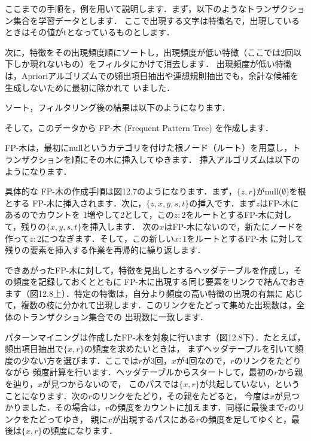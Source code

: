 ここまでの手順を，例を用いて説明します．まず，以下のようなトランザクション集合を学習データとします．
ここで出現する文字は特徴名で，出現しているときはその値がtとなっているものとします．


次に，特徴をその出現頻度順にソートし，出現頻度が低い特徴（ここでは2回以下しか現れないもの）をフィルタにかけて消去します．
出現頻度が低い特徴は，Aprioriアルゴリズムでの頻出項目抽出や連想規則抽出でも，余計な候補を生成しないために最初に除かれて
いました．

ソート，フィルタリング後の結果は以下のようになります．



そして，このデータから
FP-木 (Frequent Pattern Tree) 
を作成します．

FP-木は，最初にnullというカテゴリを付けた根ノード（ルート）を用意し，トランザクションを順にその木に挿入してゆきます．
挿入アルゴリズムは以下のようになります．


具体的な FP-木の作成手順は図12.7のようになります．まず，$\{z,r\}$がnull($\emptyset$)を根とする
FP-木に挿入されます．次に，$\{z,x,y,s,t\}$の挿入です．まず$z$はFP-木にあるのでカウントを
1増やして2として，この$z:2$をルートとするFP-木に対して，残りの$\{x,y,s,t\}$を挿入します．
次の$x$はFP-木にないので，新たにノードを作って$z:2$につなぎます．そして，この新しい$x:1$をルートとするFP-木
に対して残りの要素を挿入する作業を再帰的に繰り返します．


できあがったFP-木に対して，特徴を見出しとするヘッダテーブルを作成し，その頻度を記録しておくとともに
FP-木に出現する同じ要素をリンクで結んでおきます（図12.8上）．特定の特徴は，自分より頻度の高い特徴の出現の有無に
応じて，複数の枝に分かれて出現します．このリンクをたどって集めた出現数は，全体のトランザクション集合での
出現数に一致します．



パターンマイニングは作成したFP-木を対象に行います（図12.8下）．たとえば，頻出項目抽出で$\{x,r\}$の頻度を求めたいときは，
まずヘッダテーブルを引いて頻度の少ない方を選びます．ここでは$r$が3回，$x$が4回なので，$r$のリンクをたどりながら
頻度計算を行います．ヘッダテーブルからスタートして，最初の$r$から親を辿り，$x$が見つからないので，
このパスでは$\{x,r\}$が共起していない，ということになります．次の$r$のリンクをたどり，その親をたどると，
今度は$x$が見つかりました．その場合は，$r$の頻度をカウントに加えます．同様に最後まで$r$のリンクをたどってゆき，
親に$x$が出現するパスにある$r$の頻度を足してゆくと，最後は$\{x,r\}$の頻度になります．


